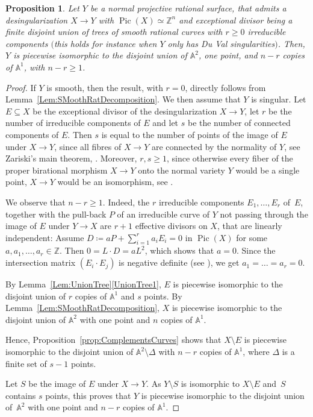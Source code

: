 \documentclass[JEP,XML,SOM,Unicode,NoFloatCountersInSection,published]{cedram}
\newtheorem{proposition}[lemma]{Proposition}
\theoremstyle{definition}
\newcommand\A{{\mathbb A}}\let\AA\A
\newcommand\Z{{\mathbb Z}}\let\ZZ\Z
\DeclareMathOperator{\Pic}{Pic}
\begin{document}
\begin{proposition}\label{prop:NormalTrees}
Let $Y$ be a normal
projective rational surface,
that admits a desingularization $X\to Y$ with $\Pic(X)\simeq \Z^n$
and exceptional divisor being a finite disjoint union of trees of smooth rational curves with $r\ge 0$
irreducible components $($this holds for instance when $Y$ only has Du Val singularities$)$.
Then, $Y$ is piecewise isomorphic to the disjoint union of $\A^2$, one point, and $n-r$ copies of $\A^1$,
with $n-r\ge 1$.
\end{proposition}
\begin{proof}
If $Y$ is smooth, then the result, with $r=0$, directly follows from Lemma~\ref{Lem:SMoothRatDecomposition}.
We then assume that $Y$ is singular. Let $E\subseteq X$ be the exceptional divisor of the desingularization $X\to Y$,
let $r$ be the number of irreducible components of $E$ and
let $s$ be the number of connected components of $E$.
Then $s$ is equal to the number of points of the image of $E$ under $X \to Y$,
since all fibres of $X \to Y$ are connected by the normality of $Y$,
see Zariski's main theorem, \cite[Ch.\,III, Cor.\,11.4]{Ha1977Algebraic-geometry}.
Moreover, $r,s \geq 1$, since otherwise every fiber of the proper birational morphism $X \to Y$ onto the normal variety $Y$
would be a single point, \ie $X \to Y$ would be an isomorphism, see
\cite[Cor.\,4.4.9]{Gr1961Elements-de-geomet-III}.

We observe that $n-r\ge 1$. Indeed, the $r$ irreducible components $E_1, \ldots, E_r$ of~$E$, together with the pull-back $P$ of an irreducible curve of $Y$ not passing through the image of $E$ under $Y \to X$
are $r+1$ effective divisors on $X$, that are linearly independent:
Assume $D \coloneqq aP + \sum_{i=1}^r a_i E_i = 0$ in $\Pic(X)$ for some
$a, a_1, \ldots, a_r \in \ZZ$. Then $0 = L \cdot D = a L^2$, which shows that $a = 0$. Since the intersection matrix
$(E_i \cdot E_j)$ is negative definite (see \cite[\S2, (2.1)]{Ar1962Some-numerical-cri}), we get $a_1 = \ldots = a_r = 0$.

By Lemma~\ref{Lem:UnionTree}\ref{UnionTree1}, $E$ is piecewise isomorphic to the disjoint union of $r$ copies of $\A^1$ and $s$ points.
By Lemma~\ref{Lem:SMoothRatDecomposition}, $X$ is piecewise isomorphic to the disjoint union of $\A^2$ with one point and $n$ copies of $\A^1$.

Hence, Proposition~\ref{prop:ComplementsCurves} shows that $X\setminus E$ is piecewise isomorphic to the disjoint union of $\A^2\setminus \Delta$ with $n-r$ copies of $\A^1$, where $\Delta$ is a finite set of $s-1$ points.

Let $S$ be the image of $E$ under $X \to Y$.
As $Y\setminus S$ is isomorphic to $X\setminus E$ and~$S$ contains $s$ points, this proves that
$Y$ is piecewise isomorphic to the disjoint union of~$\A^2$ with one point and $n-r$ copies of $\A^1$.
\end{proof}
\end{document}
